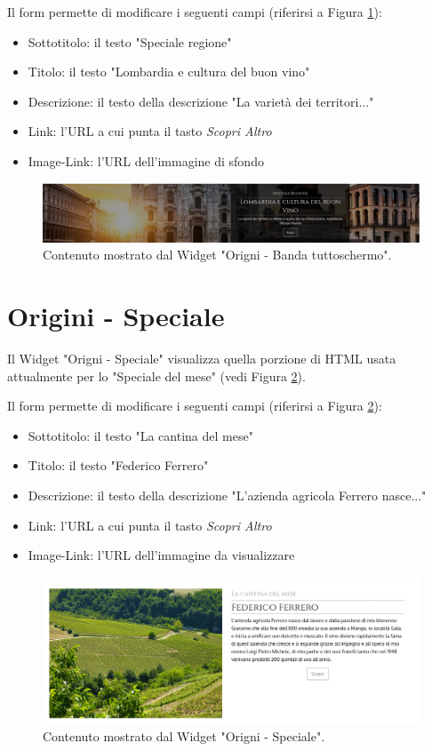 Il form permette di modificare i seguenti campi (riferirsi a Figura \ref{fig:oreg}):
\begin{itemize}
\item Sottotitolo: il testo "Speciale regione"
\item Titolo: il testo "Lombardia e cultura del buon vino"
\item Descrizione: il testo della descrizione "La varietà dei territori..."
\item Link: l'URL a cui punta il tasto \emph{Scopri Altro}
\item Image-Link: l'URL dell'immagine di sfondo
\end{itemize}

\begin{figure}
  \includegraphics[width=\textwidth]{figure/oreg.png}
  \caption{Contenuto mostrato dal Widget "Origni - Banda tuttoschermo".}
  \label{fig:oreg}
\end{figure}

\newpage
\section{Origini - Speciale}
Il Widget "Origni - Speciale" visualizza quella porzione di HTML
usata attualmente per lo "Speciale del mese" (vedi Figura \ref{fig:ospec}).

Il form permette di modificare i seguenti campi (riferirsi a Figura \ref{fig:ospec}):
\begin{itemize}
\item Sottotitolo: il testo "La cantina del mese"
\item Titolo: il testo "Federico Ferrero"
\item Descrizione: il testo della descrizione "L’azienda agricola Ferrero nasce..."
\item Link: l'URL a cui punta il tasto \emph{Scopri Altro}
\item Image-Link: l'URL dell'immagine da visualizzare
\end{itemize}

\begin{figure}
  \includegraphics[width=\textwidth]{figure/ospec.png}
  \caption{Contenuto mostrato dal Widget "Origni - Speciale".}
  \label{fig:ospec}
\end{figure}

